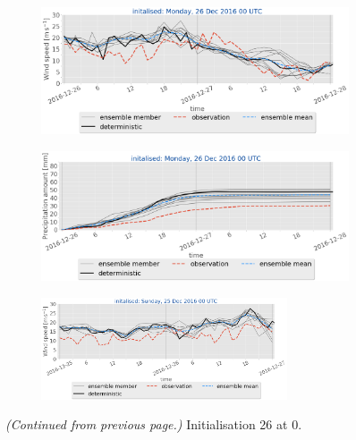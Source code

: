 \begin{figure}[H]
	\begin{subfigure}[b]{0.49\textwidth}
		\includegraphics[trim={0.cm 5.cm 0cm 0cm},clip,
		width=\textwidth]{./fig_sfc_ws/20161226_00}
		\caption{}\label{fig:res:sfc_ws26}
	\end{subfigure}
	
	\begin{subfigure}[b]{0.49\textwidth}
		\includegraphics[trim={0.cm 3.6cm 0cm 0cm},clip,
		width=\textwidth]{./fig_sfc_precip/20161226_00}
		\caption{}\label{fig:res:sfc_precip26}
	\end{subfigure}
	
	\begin{subfigure}[b]{\textwidth}
		\centering
		\includegraphics[trim={5.5cm 0cm 5.cm 17.2cm},clip,
		width=0.8\textwidth]{./fig_sfc_ws/20161225_00}
	\end{subfigure}
	\caption{\textit{(Continued from previous page.)} Initialisation \SI{26}{\dec} at \SI{0}{\UTC}.}
\end{figure}
